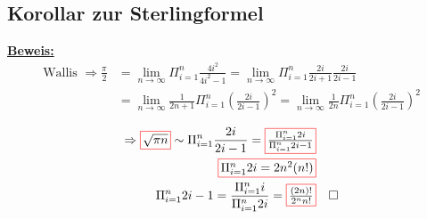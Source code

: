 \subsection{Korollar zur Sterlingformel}

\renewcommand*{\rectangled}[1]{\tikz[baseline=(char.base)]{
  \node[shape=rectangle,draw,inner sep=2pt, red] (char) {\textcolor{black}{#1}};}}
\newcommand{\pihalbe}{\frac{\pi}{2}}
\newcommand{\limmesngegenunendlich}{\lim_{n \rightarrow \infty}}
\newcommand{\pivoneinsbisn}{\Pi_{i = 1}^{n}}
\underline{\textbf{Beweis:}}
\begin{align*}
    \text{Wallis } \Rightarrow \frac{\pi}{2} &= \limmesngegenunendlich \pivoneinsbisn \frac{4i^2}{4i^2-1} = \limmesngegenunendlich \pivoneinsbisn\frac{2i}{2i+1} \frac{2i}{2i-1}\\
    &= \limmesngegenunendlich \frac{1}{2n+1} \pivoneinsbisn\left(\frac{2i}{2i-1} \right)^2 = \limmesngegenunendlich \frac{1}{2n}\pivoneinsbisn \left(\frac{2i}{2i-1} \right)^2\\
\end{align*}
\begin{align*}
    \Rightarrow \rectangled{$\sqrt{\pi n}$} \sim \pivoneinsbisn \frac{2i}{2i-1} = \rectangled{$\frac{\pivoneinsbisn 2i}{\pivoneinsbisn 2i-1}$}\\
    \rectangled{$\pivoneinsbisn 2i = 2n^2 (n!)$}\\
    \pivoneinsbisn 2i-1 = \frac{\pivoneinsbisn i}{\pivoneinsbisn 2i} = \rectangled{$\frac{(2n)!}{2^n n!}$} && \square
\end{align*}

